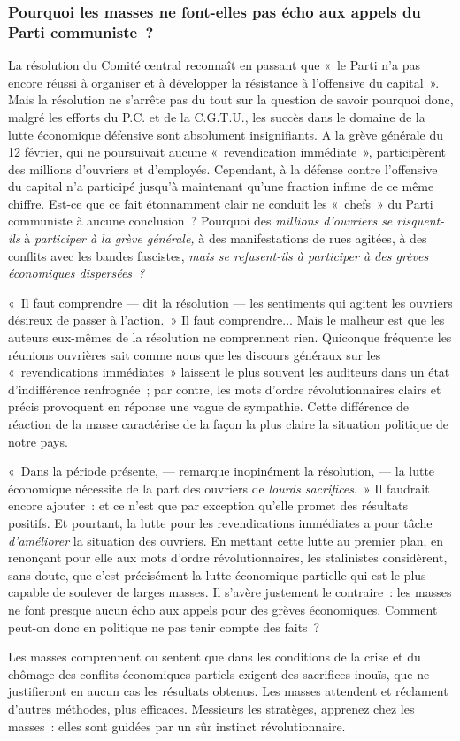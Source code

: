 \documentclass[french,twoside]{book} %
\begin{document}
\subsubsection[{Pourquoi les masses ne font-elles pas écho aux appels du Parti communiste ?}]{Pourquoi les masses ne font-elles pas écho aux appels du Parti communiste ?}
\noindent La résolution du Comité central reconnaît en passant que « le Parti n’a pas encore réussi à organiser et à développer la résistance à l’offensive du capital ». Mais la résolution ne s’arrête pas du tout sur la question de savoir pourquoi donc, malgré les efforts du P.C. et de la C.G.T.U., les succès dans le domaine de la lutte économique défensive sont absolument insignifiants. A la grève générale du 12 février, qui ne poursuivait aucune « revendication  immédiate », participèrent des millions d’ouvriers et d’employés. Cependant, à la défense contre l’offensive du capital n’a participé jusqu’à maintenant qu’une fraction infime de ce même chiffre. Est-ce que ce fait étonnamment clair ne conduit les « chefs » du Parti communiste à aucune conclusion ? Pourquoi des \emph{millions d’ouvriers se risquent-ils} à \emph{participer à la grève générale,} à des manifestations de rues agitées, à des conflits avec les bandes fascistes, \emph{mais se refusent-ils à participer à des grèves économiques dispersées ?}\par
« Il faut comprendre — dit la résolution — les sentiments qui agitent les ouvriers désireux de passer à l’action. » Il faut comprendre... Mais le malheur est que les auteurs eux-mêmes de la résolution ne comprennent rien. Quiconque fréquente les réunions ouvrières sait comme nous que les discours généraux sur les « revendications immédiates » laissent le plus souvent les auditeurs dans un état d’indifférence renfrognée ; par contre, les mots d’ordre révolutionnaires clairs et précis provoquent en réponse une vague de sympathie. Cette différence de réaction de la masse caractérise de la façon la plus claire la situation politique de notre pays.\par
« Dans la période présente, — remarque inopinément la résolution, — la lutte économique nécessite de la part des ouvriers de \emph{lourds sacrifices}. » Il faudrait encore ajouter : et ce n’est que par exception qu’elle promet des résultats positifs. Et pourtant, la lutte pour les revendications immédiates a pour tâche \emph{d’améliorer} la situation des ouvriers. En mettant cette lutte au premier plan, en renonçant pour elle aux mots d’ordre révolutionnaires, les stalinistes considèrent, sans doute, que c’est précisément la lutte économique partielle qui est le plus capable de soulever de larges masses. Il s’avère justement le contraire : les masses ne font presque aucun écho aux appels  pour des grèves économiques. Comment peut-on donc en politique ne pas tenir compte des faits ?\par
Les masses comprennent ou sentent que dans les conditions de la crise et du chômage des conflits économiques partiels exigent des sacrifices inouïs, que ne justifieront en aucun cas les résultats obtenus. Les masses attendent et réclament d’autres méthodes, plus efficaces. Messieurs les stratèges, apprenez chez les masses : elles sont guidées par un sûr instinct révolutionnaire.
\end{document}
